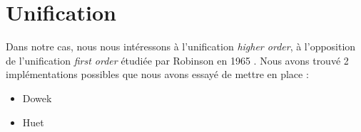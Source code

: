 \section{Unification}
Dans notre cas, nous nous intéressons à l'unification \textit{higher order}, à l'opposition de l'unification \textit{first order} étudiée par Robinson en 1965 \cite{robinson1965machine}\cite{robinson1971computational}. Nous avons trouvé 2 implémentations possibles que nous avons essayé de mettre en place : 
\begin{itemize}
    \item Dowek
    \item Huet
\end{itemize}


